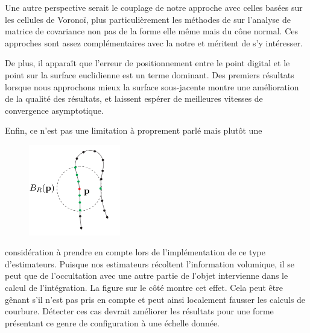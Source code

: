 Une autre perspective serait le couplage de notre approche avec celles basées
sur les cellules de Voronoï, plus particulièrement les méthodes de \VCMM
\cite{Merigot2009,Merigot2011,Cuel2014DGCI} sur l'analyse de matrice de covariance
non pas de la forme elle même mais du cône normal. Ces approches sont
assez complémentaires avec la notre et méritent de s'y intéresser.


De plus, il apparaît que l'erreur de positionnement entre le point digital et le
point sur la surface euclidienne est un terme dominant. Des premiers résultats
lorsque nous approchons mieux la surface sous-jacente montre une amélioration de
la qualité des résultats, et laissent espérer de meilleures vitesses de
convergence asymptotique.

Enfin, ce n'est pas une limitation à proprement parlé mais plutôt une
%
\begin{figure}
	\includegraphics[width=4cm]{images/CriticalRadius}
\end{figure}
%
considération à prendre en compte lors de l'implémentation de ce type
d'estimateurs. Puisque nos estimateurs récoltent l'information volumique, il se
peut que de l'occultation avec une autre partie de l'objet intervienne dans le
calcul de l’intégration. La figure sur le côté montre cet effet. Cela peut être
gênant s'il n'est pas pris en compte et peut ainsi localement fausser les
calculs de courbure. Détecter ces cas devrait améliorer les résultats pour une
forme présentant ce genre de configuration à une échelle donnée.
%
